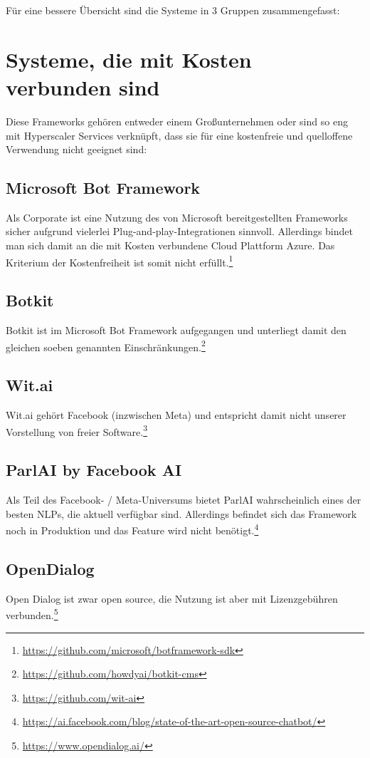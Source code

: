     Für eine bessere Übersicht sind die Systeme in 3 Gruppen zusammengefasst:

    \section{Systeme, die mit Kosten verbunden sind}
    Diese Frameworks gehören entweder einem Großunternehmen oder sind so eng mit Hyperscaler Services verknüpft, dass sie für eine kostenfreie und quelloffene Verwendung nicht geeignet sind:

    
    \subsection{Microsoft Bot Framework} 
        Als Corporate ist eine Nutzung des von Microsoft bereitgestellten Frameworks sicher aufgrund vielerlei Plug-and-play-Integrationen sinnvoll. Allerdings bindet man sich damit an die mit Kosten verbundene Cloud Plattform Azure. Das Kriterium der Kostenfreiheit ist somit nicht erfüllt.\footnote{\url{https://github.com/microsoft/botframework-sdk}}
        

    \subsection{Botkit} 
        Botkit ist im Microsoft Bot Framework aufgegangen und unterliegt damit den gleichen soeben genannten Einschränkungen.\footnote{\url{https://github.com/howdyai/botkit-cms}} 
        
    \subsection{Wit.ai} 
        Wit.ai gehört Facebook (inzwischen Meta) und entspricht damit nicht unserer Vorstellung von freier Software.\footnote{\url{https://github.com/wit-ai}}        

    \subsection{ParlAI by Facebook AI} 
        Als Teil des Facebook- / Meta-Universums bietet ParlAI wahrscheinlich eines der besten NLPs, die aktuell verfügbar sind. Allerdings befindet sich das Framework noch in Produktion und das Feature wird nicht benötigt.\footnote{\url{https://ai.facebook.com/blog/state-of-the-art-open-source-chatbot/}}
                
    \subsection{OpenDialog} 
        Open Dialog ist zwar open source, die Nutzung ist aber mit Lizenzgebühren verbunden.\footnote{\url{https://www.opendialog.ai/}}

